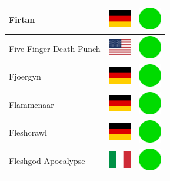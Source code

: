 \documentclass[12pt, a4paper, twoside]{report}
\begin{document}
\begin{center}
\begin{longtable}{|p{5cm}|p{2cm}|p{2cm}|}
Firtan & \includegraphics[width=1cm]{4x3/de} & \includegraphics[width=1cm]{likes/y} \\ \hline
Five Finger Death Punch & \includegraphics[width=1cm]{4x3/us} & \includegraphics[width=1cm]{likes/y} \\ \hline
Fjoergyn & \includegraphics[width=1cm]{4x3/de} & \includegraphics[width=1cm]{likes/y} \\ \hline
Flammenaar & \includegraphics[width=1cm]{4x3/de} & \includegraphics[width=1cm]{likes/y} \\ \hline
Fleshcrawl & \includegraphics[width=1cm]{4x3/de} & \includegraphics[width=1cm]{likes/y} \\ \hline
Fleshgod Apocalypse & \includegraphics[width=1cm]{4x3/it} & \includegraphics[width=1cm]{likes/y} \\ \hline

\end{longtable}
\end{center}
\end{document}
